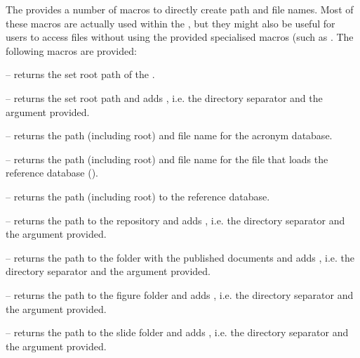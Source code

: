 
\DescribeMacro{\skbfileroot}
\DescribeMacro{\skbpathroot}
\DescribeMacro{\skbfileacr}
\DescribeMacro{\skbfilebib}
\DescribeMacro{\skbpathbib}
\DescribeMacro{\skbfilerep}
\DescribeMacro{\skbfilepub}
\DescribeMacro{\skbfilefig}
\DescribeMacro{\skbfilesli}
The  provides a number of macros to directly create path and file names. Most of 
these macros are actually used within the , but they might also be useful for 
users to access files without using the provided specialised macros (such as \cmd{\skbinput}.
The following macros are provided:
\begin{skbnotelist}
  \item \cmd{\skbpathroot} -- returns the set root path of the .
  \item \cmd{\skbfileroot} -- returns the set root path and adds , i.e. the directory separator and the argument provided.
  \item \cmd{\skbfileacr} -- returns the path (including root) and file name for the acronym database.
  \item \cmd{\skbfilebib} -- returns the path (including root) and file name for the file that loads the reference database (\BibTeX).
  \item \cmd{\skbpathbib} -- returns the path (including root) to the reference database.
  \item \cmd{\skbfilerep} -- returns the path to the repository and adds , i.e. the directory separator and the argument provided.
  \item \cmd{\skbfilepub} -- returns the path to the folder with the published documents and adds , i.e. the directory separator and the argument provided.
  \item \cmd{\skbfilefig} -- returns the path to the figure folder and adds , i.e. the directory separator and the argument provided.
  \item \cmd{\skbfilesli} -- returns the path to the slide folder and adds , i.e. the directory separator and the argument provided.
\end{skbnotelist}
